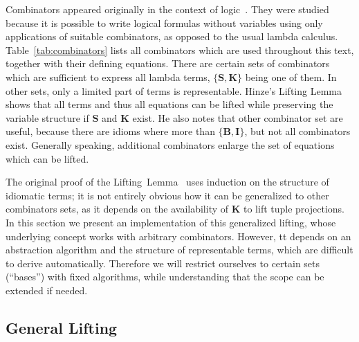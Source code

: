 Combinators appeared originally in the context of logic~\cite{curry68}.
They were studied because it is possible to write logical formulas without
variables using only applications of suitable combinators, as opposed to the
usual lambda calculus.
Table~\ref{tab:combinators} lists all combinators which are used throughout
this text, together with their defining equations.
There are certain sets of combinators which are sufficient to express all
lambda terms, $\{\mathbf{S,K}\}$ being one of them.
In other sets, only a limited part of terms is representable.
Hinze's Lifting Lemma shows that all terms and thus all equations can be
lifted while preserving the variable structure if $\mathbf{S}$ and $\mathbf{K}$
exist.
He also notes that other combinator set are useful, because there are idioms
where more than $\{\mathbf{B,I}\}$, but not all combinators exist.
Generally speaking, additional combinators enlarge the set of equations which
can be lifted.

The original proof of the Lifting~Lemma~\cite[11--14]{hinze10} uses induction
on the structure of idiomatic terms; it is not entirely obvious how it can
be generalized to other combinators sets, as it depends on the availability
of $\mathbf{K}$ to lift tuple projections.
In this section we present an implementation of this generalized lifting,
whose underlying concept works with arbitrary combinators.
However, tt depends on an abstraction algorithm and the structure of
representable terms, which are difficult to derive automatically.
Therefore we will restrict ourselves to certain sets (``bases'') with
fixed algorithms, while understanding that the scope can be extended 
if needed.

\subsection{General Lifting}\label{subsec:general-lifting}

